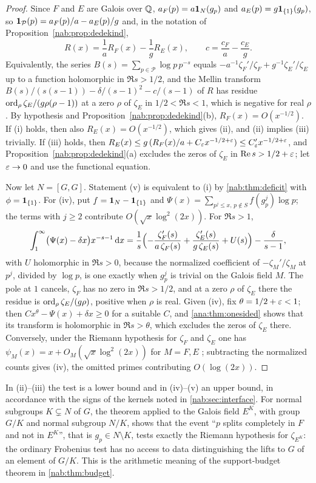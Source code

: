 \begin{proof}
Since $F$ and $E$ are Galois over $\mathbb{Q}$, $a_F(p)=a\mathbf{1}_N(g_p)$ and
$a_E(p)=g\mathbf{1}_{\{1\}}(g_p)$, so $\mathbf{1}_{\mathcal P}(p)=a_F(p)/a-a_E(p)/g$ and, in the
notation of Proposition~\ref{nab:prop:dedekind},
\[
 R(x)=\frac1aR_F(x)-\frac1gR_E(x),\qquad c=\frac{c_F}a-\frac{c_E}g .
\]
Equivalently, the series $B(s)=\sum_{p\in\mathcal P}\log p\,p^{-s}$ equals
$-a^{-1}\zeta_F'/\zeta_F+g^{-1}\zeta_E'/\zeta_E$ up to a function holomorphic in
$\Re s>1/2$, and the Mellin transform $B(s)/(s(s-1))-\delta/(s-1)^2-c/(s-1)$ of $R$ has
residue $\operatorname{ord}_\rho\zeta_E/(g\rho(\rho-1))$ at a zero $\rho$ of $\zeta_E$ in
$1/2<\Re s<1$, which is negative for real $\rho$. By hypothesis and
Proposition~\ref{nab:prop:dedekind}(b), $R_F(x)=O(x^{-1/2})$. If (i) holds, then also
$R_E(x)=O(x^{-1/2})$, which gives (ii), and (ii) implies (iii) trivially. If (iii) holds,
then $R_E(x)\le g\,(R_F(x)/a+C_\varepsilon x^{-1/2+\varepsilon})\le C_\varepsilon'x^{-1/2+\varepsilon}$, and
Proposition~\ref{nab:prop:dedekind}(a) excludes the zeros of $\zeta_E$ in $\operatorname{Re} s>1/2+\varepsilon$; let
$\varepsilon\to0$ and use the functional equation.

Now let $N=[G,G]$. Statement (v) is equivalent to (i) by \cref{nab:thm:deficit} with
$\phi=\mathbf{1}_{\{1\}}$. For (iv), put $f=\mathbf{1}_N-\mathbf{1}_{\{1\}}$ and
$\Psi(x)=\sum_{p^j\le x,\,p\notin S}f(g_p^j)\log p$; the terms with $j\ge2$ contribute
$O(\sqrt x\log^2(2x))$. For $\Re s>1$,
\[
 \int_1^\infty\bigl(\Psi(x)-\delta x\bigr)x^{-s-1}\,\mathrm{d} x
 =\frac1s\Bigl(-\frac{\zeta_F'(s)}{a\,\zeta_F(s)}+\frac{\zeta_E'(s)}{g\,\zeta_E(s)}+U(s)\Bigr)
  -\frac{\delta}{s-1},
\]
with $U$ holomorphic in $\Re s>0$, because the normalized coefficient of
$-\zeta_M'/\zeta_M$ at $p^j$, divided by $\log p$, is one exactly when $g_p^j$ is trivial on
the Galois field $M$. The pole at $1$ cancels, $\zeta_F$ has no zero in $\Re s>1/2$, and at
a zero $\rho$ of $\zeta_E$ there the residue is $\operatorname{ord}_\rho\zeta_E/(g\rho)$, positive when
$\rho$ is real. Given (iv), fix $\theta=1/2+\varepsilon<1$; then $Cx^\theta-\Psi(x)+\delta x\ge0$
for a suitable $C$, and \cref{ana:thm:onesided} shows that its transform is holomorphic in
$\Re s>\theta$, which excludes the zeros of $\zeta_E$ there. Conversely, under the Riemann
hypothesis for $\zeta_F$ and $\zeta_E$ one has
$\psi_M(x)=x+O_M(\sqrt x\log^2(2x))$ for $M=F,E$ \cite{GrenieMolteni2016Explicit};
subtracting the normalized counts gives (iv), the omitted primes contributing
$O(\log(2x))$.
\end{proof}

In (ii)--(iii) the test is a lower bound and in (iv)--(v) an upper bound, in accordance
with the signs of the kernels noted in \cref{nab:sec:interface}. For normal subgroups
$K\subsetneq N$ of $G$, the theorem applied to the Galois field $E^K$, with group $G/K$ and
normal subgroup $N/K$, shows that the event ``$p$ splits completely in $F$ and not in
$E^K$'', that is $g_p\in N\setminus K$, tests exactly the Riemann hypothesis for
$\zeta_{E^K}$: the ordinary Frobenius test has no access to data distinguishing the lifts
to $G$ of an element of $G/K$. This is the arithmetic meaning of the support-budget theorem
in \cref{nab:thm:budget}.

